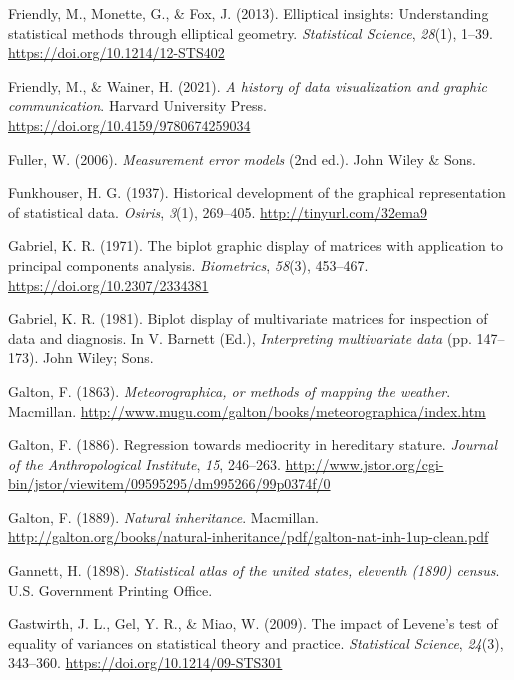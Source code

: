\documentclass[
  letterpaper,
  10pt,
  krantz2]{krantz}
\newlength{\cslhangindent}
\newenvironment{CSLReferences}[2] %
 {\begin{list}{}{%
  \setlength{\itemindent}{0pt}
  \setlength{\leftmargin}{0pt}
  \setlength{\parsep}{0pt}
  \ifodd #1
   \setlength{\leftmargin}{\cslhangindent}
   \setlength{\itemindent}{-1\cslhangindent}
  \fi
  \setlength{\itemsep}{#2\baselineskip}}}
 {\end{list}}
\begin{document}
\begin{CSLReferences}{1}{0}
Friendly, M., Monette, G., \& Fox, J. (2013). Elliptical insights:
Understanding statistical methods through elliptical geometry.
\emph{Statistical Science}, \emph{28}(1), 1--39.
\url{https://doi.org/10.1214/12-STS402}

Friendly, M., \& Wainer, H. (2021). \emph{A history of data
visualization and graphic communication}. Harvard University Press.
\url{https://doi.org/10.4159/9780674259034}

Fuller, W. (2006). \emph{Measurement error models} (2nd ed.). John Wiley
\& Sons.

Funkhouser, H. G. (1937). Historical development of the graphical
representation of statistical data. \emph{Osiris}, \emph{3}(1),
269--405. \url{http://tinyurl.com/32ema9}

Gabriel, K. R. (1971). The biplot graphic display of matrices with
application to principal components analysis. \emph{Biometrics},
\emph{58}(3), 453--467. \url{https://doi.org/10.2307/2334381}

Gabriel, K. R. (1981). Biplot display of multivariate matrices for
inspection of data and diagnosis. In V. Barnett (Ed.),
\emph{Interpreting multivariate data} (pp. 147--173). John Wiley; Sons.

Galton, F. (1863). \emph{Meteorographica, or methods of mapping the
weather}. Macmillan.
\url{http://www.mugu.com/galton/books/meteorographica/index.htm}

Galton, F. (1886). Regression towards mediocrity in hereditary stature.
\emph{Journal of the Anthropological Institute}, \emph{15}, 246--263.
\url{http://www.jstor.org/cgi-bin/jstor/viewitem/09595295/dm995266/99p0374f/0}

Galton, F. (1889). \emph{Natural inheritance}. Macmillan.
\url{http://galton.org/books/natural-inheritance/pdf/galton-nat-inh-1up-clean.pdf}

Gannett, H. (1898). \emph{Statistical atlas of the united states,
eleventh (1890) census}. U.S. Government Printing Office.

Gastwirth, J. L., Gel, Y. R., \& Miao, W. (2009). The impact of
{Levene's} test of equality of variances on statistical theory and
practice. \emph{Statistical Science}, \emph{24}(3), 343--360.
\url{https://doi.org/10.1214/09-STS301}


\end{CSLReferences}
\end{document}
